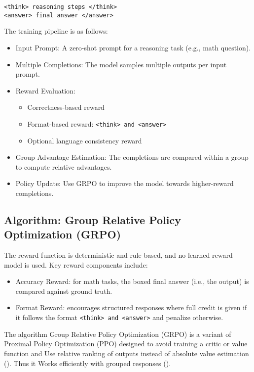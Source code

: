\documentclass{article} %
\begin{document}
\begin{center}
    \texttt{<think> reasoning steps </think>} \\
    \texttt{<answer> final answer </answer>}
\end{center}

The training pipeline is as follows:
\begin{itemize}
    \item Input Prompt: A zero-shot prompt for a reasoning task (e.g., math question).
    \item Multiple Completions: The model samples multiple outputs per input prompt.
    \item Reward Evaluation: 
    \begin{itemize}
        \item Correctness-based reward 
        \item Format-based reward: \texttt{<think> and <answer>} 
        \item Optional language consistency reward
    \end{itemize}
    \item Group Advantage Estimation: The completions are compared within a group to compute relative advantages.
    \item Policy Update: Use GRPO to improve the model towards higher-reward completions.

\end{itemize}

\subsection{Algorithm: Group Relative Policy Optimization (GRPO)}

The reward function is deterministic and rule-based, and no learned reward model is used. Key reward components include:
\begin{itemize}
    \item Accuracy Reward: for math tasks, the boxed final answer (i.e., the output) is compared against ground truth.
    \item Format Reward: encourages structured responses where full credit is given if it follows the format \texttt{<think> and <answer>} and penalize otherwise.
\end{itemize}

The algorithm Group Relative Policy Optimization (GRPO) is a variant of Proximal Policy Optimization (PPO) designed to avoid training a critic or value function and Use relative ranking of outputs instead of absolute value estimation (\cite{schulman2017ppo}). Thus it Works efficiently with grouped responses ()\cite{deepseek2024r1}.
\end{document}
